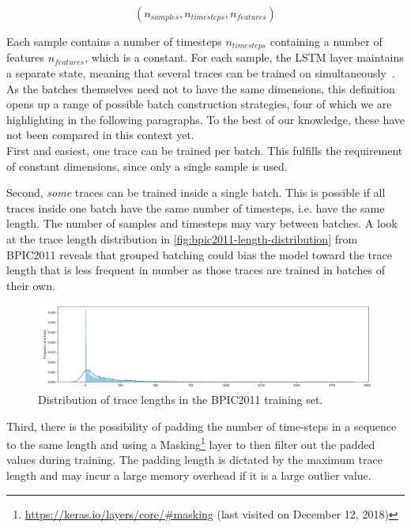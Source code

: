 $$(n_{samples}, n_{timesteps}, n_{features})$$

Each sample contains a number of timesteps $n_{timesteps}$ containing a number of features $n_{features}$, which is a constant. For each sample, the LSTM layer maintains a separate state, meaning that several traces can be trained on simultaneously~\cite{web:keras-lstm-state}. As the batches themselves need not to have the same dimensions, this definition opens up a range of possible batch construction strategies, four of which we are highlighting in the following paragraphs. To the best of our knowledge, these have not been compared in this context yet.\\

First and easiest, one trace can be trained per batch. This fulfills the requirement of constant dimensions, since only a single sample is used.

Second, \textit{some} traces can be trained inside a single batch. This is possible if all traces inside one batch have the same number of timesteps, i.e. have the same length. The number of samples and timesteps may vary between batches. A look at the trace length distribution in \autoref{fig:bpic2011-length-distribution} from BPIC2011 reveals that grouped batching could bias the model toward the trace length that is less frequent in number as those traces are trained in batches of their own.

\begin{figure}[ht!]
    \centering
    \includegraphics[width=.9\textwidth]{gfx/frequency-distribution.png}
    \caption{Distribution of trace lengths in the BPIC2011 training set.}
    \label{fig:bpic2011-length-distribution}
\end{figure}

Third, there is the possibility of padding the number of time-steps in a sequence to the same length and using a Masking\footnote{\url{https://keras.io/layers/core/\#masking} (last visited on December 12, 2018)} layer to then filter out the padded values during training. The padding length is dictated by the maximum trace length and may incur a large memory overhead if it is a large outlier value.

